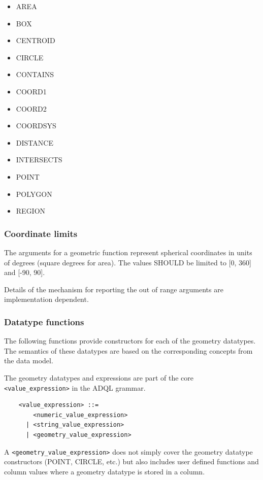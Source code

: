\documentclass[11pt,a4paper]{ivoa}
\begin{document}
\begin{itemize}
    \item AREA
    \item BOX
    \item CENTROID
    \item CIRCLE
    \item CONTAINS
    \item COORD1
    \item COORD2
    \item COORDSYS
    \item DISTANCE
    \item INTERSECTS
    \item POINT
    \item POLYGON
    \item REGION
\end{itemize}

\subsubsection{Coordinate limits}
\label{sec:functions.geom.limits}

The arguments for a geometric function represent spherical coordinates
in units of degrees (square degrees for area).
The values SHOULD be limited to [0, 360] and [-90, 90].
            
Details of the mechanism for reporting the out of range arguments are
implementation dependent.

\subsubsection{Datatype functions}
\label{sec:functions.geom.type}

The following functions provide constructors for each of the geometry datatypes.
The semantics of these datatypes are based on the corresponding
concepts from the \STCSpec{} data model.

The geometry datatypes and expressions are part of the core \verb:<value_expression>:
in the ADQL grammar.

\begin{verbatim}
    <value_expression> ::=
        <numeric_value_expression>
      | <string_value_expression>
      | <geometry_value_expression>
\end{verbatim}

A \verb:<geometry_value_expression>: does not simply cover the geometry datatype
constructors (POINT, CIRCLE, etc.) but also includes user defined functions and
column values where a geometry datatype is stored in a column.
\end{document}
